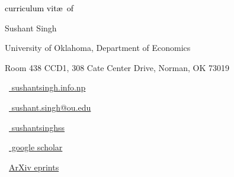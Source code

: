 \begin{scriptsize}
	 \textcolor{black}{curriculum vit\ae~of}
\end{scriptsize}

\vspace*{-0.10em}
\begin{Large} 
	Sushant Singh
\end{Large}

\vspace*{0.25em}
\begin{scshape}
	\begin{footnotesize}
		  \textcolor{highlight2}{University of Oklahoma, Department of Economics}
		  
		  \vspace*{-1ex}
		  \textcolor{highlight2}{Room 438 CCD1, 308 Cate Center Drive,
Norman, OK 73019}
	\end{footnotesize}
\end{scshape}
\vspace*{0.4cm}

\begin{footnotesize}
	\begin{tiny}\faHome\end{tiny}~\href{https://www.sushantsingh.info.np/}{
		sushantsingh.info.np
	}
	\quad \begin{tiny}\faEnvelope[regular]\end{tiny}~\href{mailto:sushant.singh@ou.edu}{%
		sushant.singh@ou.edu
		}
		
		
	\quad 
	\begin{tiny}\faLinkedinIn\end{tiny}~\href{https://www.linkedin.com/in/sushantsinghss/}{
		sushantsinghss
	}
	\quad 
	\begin{tiny}\faGraduationCap\end{tiny}~\href{https://scholar.google.com/citations?user=USERID&hl=en}{
		 google scholar
		}
\quad
\begin{tiny}\aiarXiv\end{tiny}~\href{https://arxiv.org/user/}{ArXiv eprints}

\end{footnotesize}

